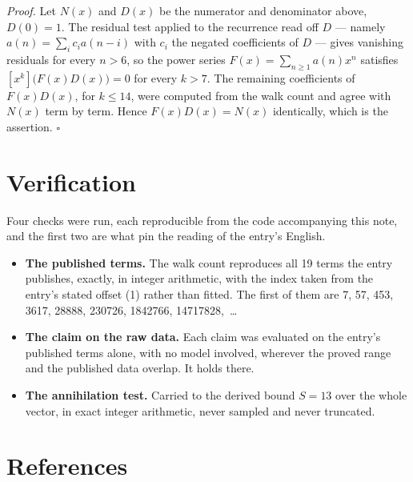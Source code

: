 \documentclass[11pt]{article}
\theoremstyle{definition}
\begin{document}
{\itshape Proof.} Let $N(x)$ and $D(x)$ be the numerator and denominator above, $D(0)=1$. The residual test applied to the recurrence read off $D$ --- namely $a(n) = \sum_i c_i a(n-i)$ with $c_i$ the negated coefficients of $D$ --- gives vanishing residuals for every $n > 6$, so the power series $F(x)=\sum_{n\ge 1}a(n)x^n$ satisfies $[x^k]\bigl(F(x)D(x)\bigr) = 0$ for every $k > 7$. The remaining coefficients of $F(x)D(x)$, for $k \le 14$, were computed from the walk count and agree with $N(x)$ term by term. Hence $F(x)D(x) = N(x)$ identically, which is the assertion. $\square$

\section{Verification}

Four checks were run, each reproducible from the code accompanying this note, and the first two are what pin the reading of the entry's English.

\begin{itemize}

\item {\bfseries The published terms.} The walk count reproduces all 19 terms the entry publishes, exactly, in integer arithmetic, with the index taken from the entry's stated offset (1) rather than fitted. The first of them are 7, 57, 453, 3617, 28888, 230726, 1842766, 14717828,~\dots

\item {\bfseries The claim on the raw data.} Each claim was evaluated on the entry's published terms alone, with no model involved, wherever the proved range and the published data overlap. It holds there.

\item {\bfseries The annihilation test.} Carried to the derived bound $S = 13$ over the whole vector, in exact integer arithmetic, never sampled and never truncated.

\end{itemize}

\section{References}
\end{document}

